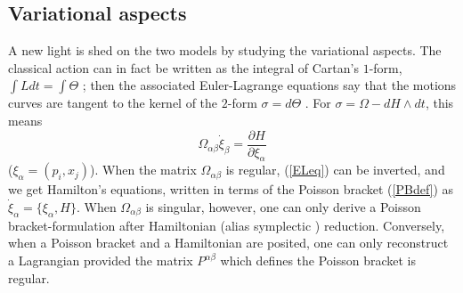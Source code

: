 \documentclass[a4paper,11pt]{article}
\def\p{{\partial}}
\begin{document}
\subsection{Variational aspects}

A new light  is shed on the two models by
studying the variational aspects.
The classical action can in fact be written as the integral of
Cartan's $1$-form, $\int Ldt=\int\Theta$ \cite{SSD}; then the
associated Euler-Lagrange equations say that the motions curves
are tangent to the kernel of the $2$-form $\sigma=d\Theta$ \cite{SSD}.
For
$\sigma=\Omega-dH\wedge dt$, this means
\begin{equation}
\Omega_{\alpha\beta}\dot{\xi}_{\beta}=\frac{\p H}{\p\xi_{\alpha}}
\label{ELeq}
\end{equation}
($\xi_{\alpha}=(p_{i}, x_{j})$). When the matrix
$\Omega_{\alpha\beta}$ is regular,
(\ref{ELeq}) can be inverted, and we get Hamilton's equations, written
in terms of the Poisson bracket (\ref{PBdef}) as $\dot{\xi}_{\alpha}=
\big\{\xi_{\alpha}, H\big\}$.
When  $\Omega_{\alpha\beta}$ is singular, however, one can only
derive a Poisson bracket-formulation after Hamiltonian \cite{FaJa}
(alias symplectic \cite{SSD}) reduction.
Conversely, when a Poisson bracket
and a Hamiltonian
are  posited, one can only reconstruct a Lagrangian
provided the matrix $P^{\alpha\beta}$ which defines the Poisson bracket
is regular.
\end{document}
